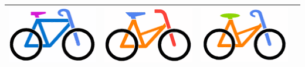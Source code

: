 \documentclass[12pt]{article}
\begin{document}
\begin{minipage}{\textwidth}
\begin{table}[H]
\begin{tabulary}{\linewidth}{|C|C|C|C|}
					\includegraphics[width=\linewidth]{option2} &			\includegraphics[width=\linewidth]{option3} &			\includegraphics[width=\linewidth]{option4} \\
					\hline 
				\end{tabulary}
			\end{table}
	\end{minipage} \\ \\
		
\end{document}
